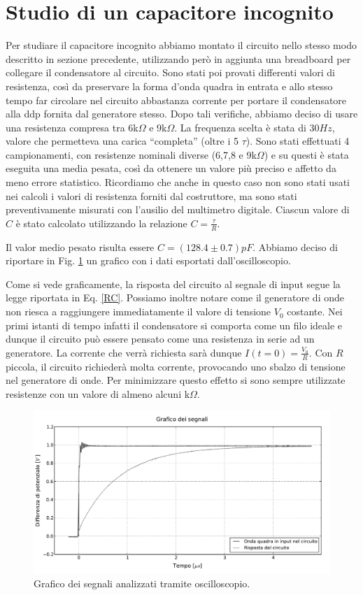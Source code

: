 \section{Studio di un capacitore incognito}
Per studiare il capacitore incognito abbiamo montato il circuito nello stesso modo descritto in sezione precedente, utilizzando però in aggiunta una breadboard per collegare il condensatore al circuito. Sono stati poi provati differenti valori di resistenza, così da preservare la forma d'onda quadra in entrata e allo stesso tempo far circolare nel circuito abbastanza corrente per portare il condensatore alla ddp fornita dal generatore stesso. Dopo tali verifiche, abbiamo deciso di usare una resistenza compresa tra $6$k$\Omega$ e $9$k$\Omega$. La frequenza scelta è stata di $30Hz$, valore che permetteva una carica ``completa'' (oltre i 5 $\tau$). Sono stati effettuati 4 campionamenti, con resistenze nominali diverse (6,7,8 e 9k$\Omega$) e su questi è stata eseguita una media pesata, così da ottenere un valore più preciso e affetto da meno errore statistico.
Ricordiamo che anche in questo caso non sono stati usati nei calcoli i valori di resistenza forniti dal costruttore, ma sono stati preventivamente misurati con l'ausilio del multimetro digitale. Ciascun valore di $C$ è stato calcolato utilizzando la relazione $C=\frac{\tau}{R}$.

Il valor medio pesato risulta essere $C=(128.4\pm0.7) pF$. Abbiamo deciso di riportare in Fig. \ref{fig:1} un grafico con i dati esportati dall'oscilloscopio. 

Come si vede graficamente, la risposta del circuito al segnale di input segue la legge riportata in Eq. \ref{RC}. 
Possiamo inoltre notare come il generatore di onde non riesca a raggiungere immediatamente il valore di tensione $V_0$ costante. Nei primi istanti di tempo infatti il condensatore si comporta come un filo ideale e dunque il circuito può essere pensato come una resistenza in serie ad un generatore. La corrente che verrà richiesta sarà dunque $I(t=0)=\frac{V_0}{R}$. Con $R$ piccola, il circuito richiederà molta corrente, provocando uno sbalzo di tensione nel generatore di onde. Per minimizzare questo effetto si sono sempre utilizzate resistenze con un valore di almeno alcuni k$\Omega$.
\begin{figure}[h]
    \centering
        \includegraphics[width=\textwidth]{figure3.pdf}%
        \caption{Grafico dei segnali analizzati tramite oscilloscopio.}
        \label{fig:1}
\end{figure}